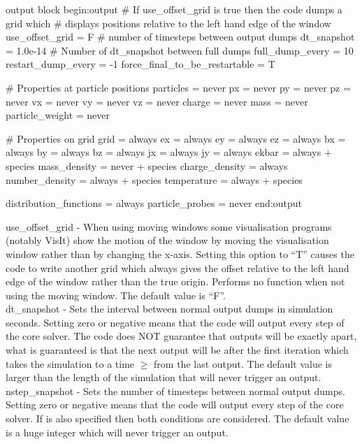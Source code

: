 \begin{lboxverbatim}{output block}
begin:output
   # If use_offset_grid is true then the code dumps a grid which
   # displays positions relative to the left hand edge of the window
   use_offset_grid = F
   # number of timesteps between output dumps
   dt_snapshot = 1.0e-14
   # Number of dt_snapshot between full dumps
   full_dump_every = 10
   restart_dump_every = -1
   force_final_to_be_restartable = T

   # Properties at particle positions
   particles = never
   px = never
   py = never
   pz = never
   vx = never
   vy = never
   vz = never
   charge = never
   mass = never
   particle_weight = never

   # Properties on grid
   grid = always
   ex = always
   ey = always
   ez = always
   bx = always
   by = always
   bz = always
   jx = always
   jy = always
   ekbar = always + species
   mass_density = never + species
   charge_density = always
   number_density = always + species
   temperature = always + species

   distribution_functions = always
   particle_probes = never
end:output
\end{lboxverbatim}

{\emphtext use\_offset\_grid} - When using moving windows some visualisation
programs (notably VisIt) show the motion of the window by moving the
visualisation window rather than by changing the x-axis. Setting this option to
``T'' causes the code to write another grid which always gives the offset
relative to the left hand edge of the window rather than the true origin.
Performs no function when not using the moving window. The default value
is ``F''.\\

{\emphtext dt\_snapshot} - Sets the interval between normal output dumps in
simulation seconds. Setting zero or negative means that the code will output
every step of the core solver. The code does NOT guarantee that outputs will be
exactly  apart, what is guaranteed is that the next
output will be after the first iteration which takes the simulation to a time
$\ge$  from the last output. The default value is
larger than the length of the simulation that will never trigger an output.\\

{\emphtext nstep\_snapshot} - Sets the number of timesteps between normal
output dumps. Setting zero or negative means that the code will output
every step of the core solver. If  is also specified
then both conditions are considered. The default value is a huge integer
which will never trigger an output.\\

